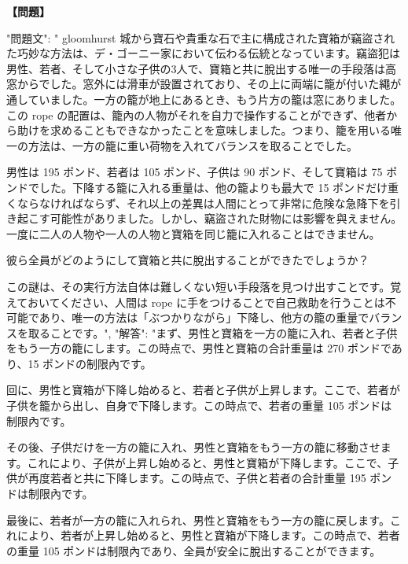 \documentclass[10pt,a4paper,oneside,openany]{ltjsbook}
\begin{document}
\begin{tcolorbox}[colback=softblue,colframe=primaryblue,title=\textbf{第 377 問：STEALING THE CASTLE TREASURE.},arc=2mm,boxrule=1pt,breakable]
\textbf{【問題】}\par\vspace{0.3em}
{
  "問題文": " gloomhurst 城から寶石や貴重な石で主に構成された寶箱が竊盜された巧妙な方法は、デ・ゴーニー家において伝わる伝統となっています。竊盜犯は男性、若者、そして小さな子供の3人で、寶箱と共に脫出する唯一の手段落は高窓からでした。窓外には滑車が設置されており、その上に両端に籠が付いた繩が通していました。一方の籠が地上にあるとき、もう片方の籠は窓にありました。この rope の配置は、籠內の人物がそれを自力で操作することができず、他者から助けを求めることもできなかったことを意味しました。つまり、籠を用いる唯一の方法は、一方の籠に重い荷物を入れてバランスを取ることでした。

男性は 195 ポンド、若者は 105 ポンド、子供は 90 ポンド、そして寶箱は 75 ポンドでした。下降する籠に入れる重量は、他の籠よりも最大で 15 ポンドだけ重くならなければならず、それ以上の差異は人間にとって非常に危険な急降下を引き起こす可能性がありました。しかし、竊盜された財物には影響を與えません。一度に二人の人物や一人の人物と寶箱を同じ籠に入れることはできません。

彼ら全員がどのようにして寶箱と共に脫出することができたでしょうか？

この謎は、その実行方法自体は難しくない短い手段落を見つけ出すことです。覚えておいてください、人間は rope に手をつけることで自己救助を行うことは不可能であり、唯一の方法は「ぶつかりながら」下降し、他方の籠の重量でバランスを取ることです。",
  "解答": "まず、男性と寶箱を一方の籠に入れ、若者と子供をもう一方の籠にします。この時点で、男性と寶箱の合計重量は 270 ポンドであり、15 ポンドの制限內です。

回に、男性と寶箱が下降し始めると、若者と子供が上昇します。ここで、若者が子供を籠から出し、自身で下降します。この時点で、若者の重量 105 ポンドは制限內です。

その後、子供だけを一方の籠に入れ、男性と寶箱をもう一方の籠に移動させます。これにより、子供が上昇し始めると、男性と寶箱が下降します。ここで、子供が再度若者と共に下降します。この時点で、子供と若者の合計重量 195 ポンドは制限內です。

最後に、若者が一方の籠に入れられ、男性と寶箱をもう一方の籠に戻します。これにより、若者が上昇し始めると、男性と寶箱が下降します。この時点で、若者の重量 105 ポンドは制限內であり、全員が安全に脫出することができます。

}
\end{tcolorbox}
\end{document}

